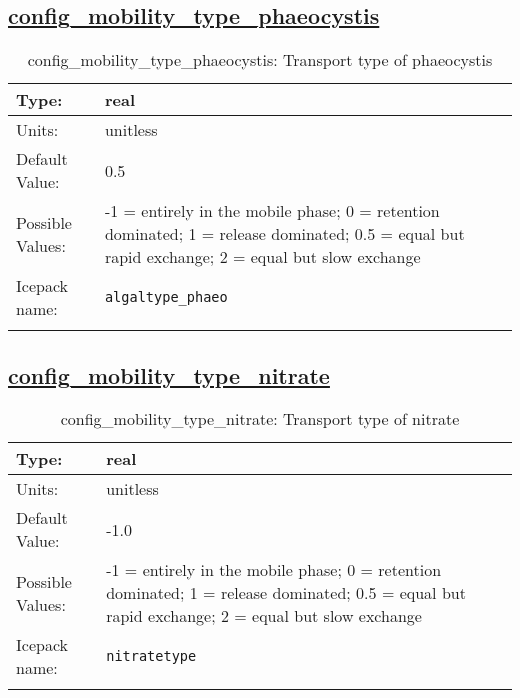 \subsection[config\_mobility\_type\_phaeocystis]{\hyperref[sec:nm_tab_biogeochemistry]{config\_mobility\_type\_phaeocystis}}
\label{subsec:nm_sec_config_mobility_type_phaeocystis}
\begin{center}
\begin{longtable}{| p{2.0in} || p{4.0in} |}
    \hline
    Type: & real \\
    \hline
    Units: & \si{unitless} \\
    \hline
    Default Value: & 0.5 \\
    \hline
    Possible Values: & -1 = entirely in the mobile phase; 0 = retention dominated; 1 = release dominated; 0.5 = equal but rapid exchange; 2 = equal but slow exchange \\
    \hline
    Icepack name: & \verb+algaltype_phaeo+ \\
    \hline
    \caption{config\_mobility\_type\_phaeocystis: Transport type of phaeocystis}
\end{longtable}
\end{center}
\subsection[config\_mobility\_type\_nitrate]{\hyperref[sec:nm_tab_biogeochemistry]{config\_mobility\_type\_nitrate}}
\label{subsec:nm_sec_config_mobility_type_nitrate}
\begin{center}
\begin{longtable}{| p{2.0in} || p{4.0in} |}
    \hline
    Type: & real \\
    \hline
    Units: & \si{unitless} \\
    \hline
    Default Value: & -1.0 \\
    \hline
    Possible Values: & -1 = entirely in the mobile phase; 0 = retention dominated; 1 = release dominated; 0.5 = equal but rapid exchange; 2 = equal but slow exchange \\
    \hline
    Icepack name: & \verb+nitratetype+ \\
    \hline
    \caption{config\_mobility\_type\_nitrate: Transport type of nitrate}
\end{longtable}
\end{center}
